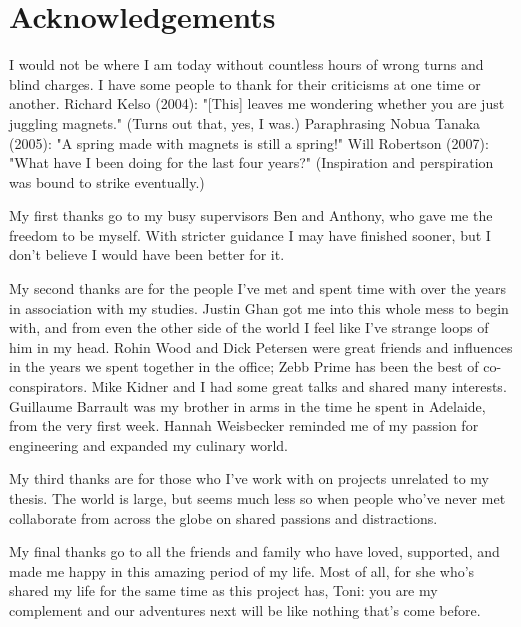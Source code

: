 
\section{Acknowledgements}

I would not be where I am today without countless hours of wrong turns and
blind charges.
I have some people to thank for their criticisms at one time or another.
Richard Kelso (2004): "[This] leaves me wondering whether you are just juggling magnets." (Turns out that, yes, I was.)
Paraphrasing Nobua Tanaka (2005): "A spring made with magnets is still a spring!"
Will Robertson (2007): "What have I been doing for the last four years?"
(Inspiration and perspiration was bound to strike eventually.)

My first thanks go to my busy supervisors Ben and Anthony, who gave me the freedom to be myself.
With stricter guidance I may have finished sooner, but I don't believe I would have been better for it.

My second thanks are for the people I've met and spent time with over the years in association with my studies.
Justin Ghan got me into this whole mess to begin with, and from even the other side of the world I feel like I've strange loops of him in my head.
Rohin Wood and Dick Petersen were great friends and influences in the years we spent together in the office; Zebb Prime has been the best of co-conspirators. Mike Kidner and I had some great talks and shared many interests.
Guillaume Barrault was my brother in arms in the time he spent in Adelaide, from the very first week.
Hannah Weisbecker reminded me of my passion for engineering and expanded my culinary world.

My third thanks are for those who I've work with on projects unrelated to my thesis.
The world is large, but seems much less so when people who've never met collaborate from across the globe on shared passions and distractions.

My final thanks go to all the friends and family who have loved, supported,
and made me happy in this amazing period of my life.
Most of all, for she who's shared my life for the same time as this project has, Toni: you are my complement and our adventures next will be like nothing that's come before.
